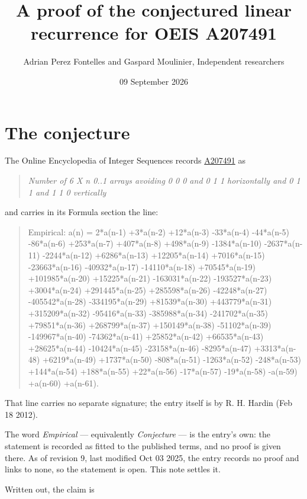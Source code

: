 \documentclass[11pt]{article}
\title{A proof of the conjectured linear recurrence for OEIS A207491}
\author{Adrian Perez Fontelles and Gaspard Moulinier, Independent researchers}
\date{09 September 2026}
\theoremstyle{definition}
\begin{document}
\maketitle
\section{The conjecture}

The Online Encyclopedia of Integer Sequences records \href{https://oeis.org/A207491}{A207491} as

\begin{quote}\itshape Number of 6 X n 0..1 arrays avoiding 0 0 0 and 0 1 1 horizontally and 0 1 1 and 1 1 0 vertically\end{quote}

and carries in its Formula section the line:

\begin{quote}\ttfamily Empirical: a(n) = 2*a(n-1) +3*a(n-2) +12*a(n-3) -33*a(n-4) -44*a(n-5) -86*a(n-6) +253*a(n-7) +407*a(n-8) +498*a(n-9) -1384*a(n-10) -2637*a(n-11) -2244*a(n-12) +6286*a(n-13) +12205*a(n-14) +7016*a(n-15) -23663*a(n-16) -40932*a(n-17) -14110*a(n-18) +70545*a(n-19) +101985*a(n-20) +15225*a(n-21) -163031*a(n-22) -193527*a(n-23) +3004*a(n-24) +291445*a(n-25) +285598*a(n-26) -42248*a(n-27) -405542*a(n-28) -334195*a(n-29) +81539*a(n-30) +443779*a(n-31) +315209*a(n-32) -95416*a(n-33) -385988*a(n-34) -241702*a(n-35) +79851*a(n-36) +268799*a(n-37) +150149*a(n-38) -51102*a(n-39) -149967*a(n-40) -74362*a(n-41) +25852*a(n-42) +66535*a(n-43) +28625*a(n-44) -10424*a(n-45) -23158*a(n-46) -8295*a(n-47) +3313*a(n-48) +6219*a(n-49) +1737*a(n-50) -808*a(n-51) -1263*a(n-52) -248*a(n-53) +144*a(n-54) +188*a(n-55) +22*a(n-56) -17*a(n-57) -19*a(n-58) -a(n-59) +a(n-60) +a(n-61).\end{quote}

That line carries no separate signature; the entry itself is by R. H. Hardin (Feb 18 2012).

The word {\itshape Empirical} --- equivalently {\itshape Conjecture} --- is the entry's own: the statement is recorded as fitted to the published terms, and no proof is given there. As of revision 9, last modified Oct 03 2025, the entry records no proof and links to none, so the statement is open. This note settles it.

Written out, the claim is
\end{document}
